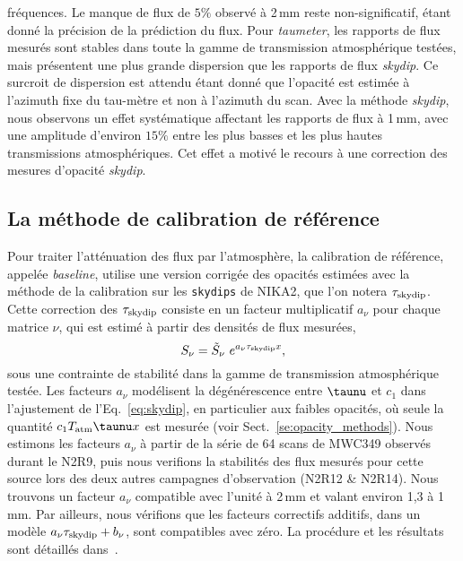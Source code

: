 fréquences. Le manque de flux de $5\%$ observé à 2\,mm reste
non-significatif, étant donné la précision de la prédiction du
flux. Pour \emph{taumeter}, les rapports de flux mesurés sont stables
dans toute la gamme de transmission atmosphérique testées, mais
présentent une plus grande dispersion que les rapports de flux
\emph{skydip}. Ce surcroit de dispersion est attendu étant donné que
l'opacité est estimée à l'azimuth fixe du tau-mètre et non à l'azimuth
du scan. Avec la méthode \emph{skydip}, nous observons un effet
systématique affectant les rapports de flux à 1\,mm, avec une
amplitude d'environ $15\%$ entre les
plus basses et les plus hautes transmissions atmosphériques. Cet effet
a motivé le recours à une correction des mesures d'opacité
\emph{skydip}.


\subsection{La méthode de calibration de référence}
\label{se:baseline_calibration}

Pour traiter l'atténuation des flux par l'atmosphère, la
calibration de référence, appelée \emph{baseline}, utilise une version
corrigée des opacités estimées avec la méthode de la calibration sur
les {\tt skydips} de NIKA2, que l'on notera
$\tau_{\rm{skydip}}$. Cette correction des $\tau_{\rm{skydip}}$
consiste en un facteur multiplicatif $a_\nu$ pour chaque matrice
$\nu$, qui est estimé à partir des densités de flux mesurées,
\begin{equation}
  S_\nu = \tilde{S}_\nu \,\,  e^{a_\nu \tau_{\rm{skydip}} x},
\end{equation}
sous une contrainte de stabilité dans la gamme de transmission
atmosphérique testée. Les facteurs $a_\nu$ modélisent la dégénérescence
entre $\taunu$ et $c_1$ dans l'ajustement de l'Eq.~\ref{eq:skydip}, en
particulier aux faibles opacités, où seule la quantité $c_1
T_{\rm{atm}} \taunu x$ est mesurée (voir Sect.~\ref{se:opacity_methods}). Nous
estimons les facteurs $a_\nu$ à partir de la série de 64 scans de
MWC349 observés durant le N2R9, puis nous verifions la stabilités des
flux mesurés pour cette source lors des deux autres campagnes
d'observation (N2R12 \& N2R14). Nous trouvons un facteur $a_\nu$
compatible avec l'unité à 2\,mm et valant environ 1,3 à 1\,mm. Par
ailleurs, nous vérifions que les facteurs correctifs additifs, dans un
modèle $a_\nu\tau_{\rm{skydip}} + b_\nu$, sont compatibles avec zéro. La
procédure et les résultats sont détaillés dans~\citet{Perotto2019}.

